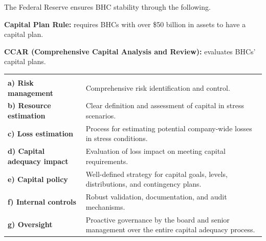 


The Federal Reserve ensures BHC stability through the following.

\begin{lettered}
\item \textbf{Capital Plan Rule:} requires BHCs with over \$50 billion in assets
to have a capital plan.
\item \textbf{CCAR (Comprehensive Capital Analysis and Review):} evaluates BHCs'
capital plans.
\end{lettered}


\noindent\begin{minipage}{\textwidth}
\renewcommand{\arraystretch}{1.35}
\begin{tabularx}{\textwidth}{@{}L{0.26\textwidth}Y@{}}
  & \\
{\tabfont \textbf{a) Risk management}} & {\tabfont Comprehensive risk identification and control.}\\
{\tabfont \textbf{b) Resource estimation}} & {\tabfont Clear definition and assessment of capital in stress scenarios.}\\
{\tabfont \textbf{c) Loss estimation}} & {\tabfont Process for estimating potential company-wide losses in stress conditions.}\\
{\tabfont \textbf{d) Capital adequacy impact}} & {\tabfont Evaluation of loss impact on meeting capital requirements.}\\
{\tabfont \textbf{e) Capital policy}} & {\tabfont Well-defined strategy for capital goals, levels, distributions, and contingency plans.}\\
{\tabfont \textbf{f) Internal controls}} & {\tabfont Robust validation, documentation, and audit mechanisms.}\\
{\tabfont \textbf{g) Oversight}} & {\tabfont Proactive governance by the board and senior management over the entire capital adequacy process.}\\
\end{tabularx}
\end{minipage}

